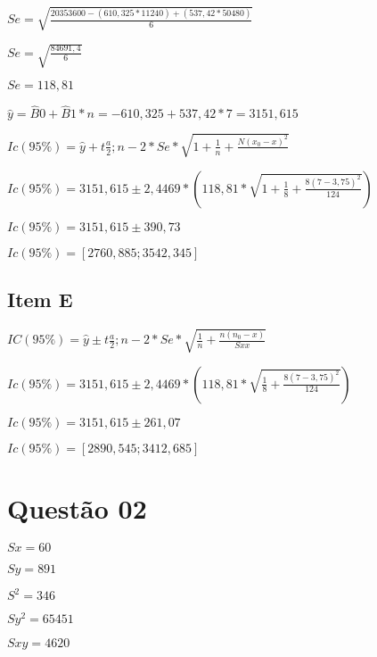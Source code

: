 \documentclass{article}
\begin{document}
    \begin{flushleft}
        $Se = \sqrt{ \frac{20353600 - (610,325 * 11240)+ (537,42 * 50480) }{6}}$

        $Se = \sqrt{ \frac{84691,4 }{6}}$

        $Se = 118,81$
    \end{flushleft}   

    \begin{flushleft}
        $\hat{y} = \hat{B}0 + \hat{B}1 *n = -610,325 + 537,42 * 7=3151,615$
    \end{flushleft}   

    \begin{flushleft}
        $Ic(95\%) = \hat{y} + t\frac{a}{2};n-2 *Se* \sqrt{1 + \frac{1}{n} +\frac{N(x_0 -x)^2}{}}$

        $Ic(95\%) = 3151,615 \pm 2,4469 *  (118,81* \sqrt{1 + \frac{1}{8} + \frac{8(7-3,75)^2}{124}})$
        
        $Ic(95\%) =  3151,615 \pm 390,73$

        $Ic(95\%) = [2760,885 ; 3542,345]$
    \end{flushleft}


    \subsection{Item E}

    \begin{flushleft}
        $IC(95\%) = \hat{y} \pm  t \frac{a}{2}; n-2 *Se * \sqrt{\frac{1}{n} + \frac{n(n_0 - x)}{Sxx}}$ 
        
        $Ic(95\%) = 3151,615 \pm 2,4469 *  (118,81* \sqrt{\frac{1}{8} + \frac{8(7-3,75)^2}{124}})$
        
        $Ic(95\%) =  3151,615 \pm 261,07$

        $Ic(95\%) = [2890,545 ; 3412,685]$


    \end{flushleft}


\section{Questão 02}   
        \begin{flushleft}
            
            $Sx = 60$ 	

            $Sy = 891$
            
            $S^2 = 346$
            
            $Sy^2 = 65451$
            
            $Sxy = 4620$
        \end{flushleft}
\end{document}
